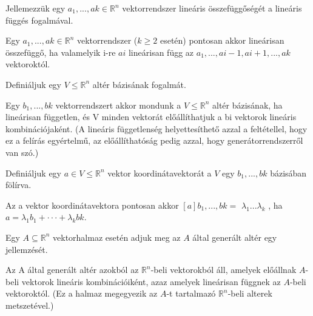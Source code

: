 \begin{frame}
  \begin{tcolorbox}[title={5}]
    Jellemezzük egy $a_1,...,ak \in \mathbb{R}^n$ vektorrendszer lineáris összefüggőségét a lineáris függés fogalmával.


  \tcblower
Egy $a_1,...,ak \in \mathbb{R}^n$ vektorrendszer ($k \geq 2$ esetén) pontosan akkor lineárisan összefüggő, ha valamelyik i-re $ai$ lineárisan függ az $a_1,...,ai-1,ai+1,...,ak$ vektoroktól.
  \end{tcolorbox}
\end{frame}


\begin{frame}
  \begin{tcolorbox}[title={6}]
      Definiáljuk egy $V \leq \mathbb{R}^n$ altér bázisának fogalmát.


  \tcblower
Egy $b_1,...,bk$ vektorrendszert akkor mondunk a $V \leq \mathbb{R}^n$ altér bázisának, ha lineárisan független, és V minden vektorát előállíthatjuk a bi vektorok lineáris kombinációjaként. (A lineáris függetlenség helyettesíthető azzal a feltétellel, hogy ez a felírás egyértelmű, az előállíthatóság pedig azzal, hogy generátorrendszerről van szó.)
  \end{tcolorbox}
\end{frame}


\begin{frame}
  \begin{tcolorbox}[title={7}]
      Definiáljuk egy $a \in V \leq \mathbb{R}^n$ vektor koordinátavektorát a $V$ egy $b_1,...,bk$ bázisában fölírva.


  \tcblower
Az a vektor koordinátavektora pontosan akkor $[a]b_1,...,bk =$
${\lambda}_1 . . . {\lambda}_k$
, ha $a = {\lambda}_1b_1+ \cdot  \cdot  \cdot +{\lambda}_kbk$.
  \end{tcolorbox}
\end{frame}


\begin{frame}
  \begin{tcolorbox}[title={8}]
       Egy $A {\subseteq} \mathbb{R}^n$ vektorhalmaz esetén adjuk meg az $A$ által generált altér egy jellemzését.


  \tcblower
Az A által generált altér azokból az $\mathbb{R}^n$-beli vektorokból áll, amelyek előállnak $A$-beli vektorok lineáris kombinációiként, azaz amelyek lineárisan függnek az $A$-beli vektoroktól. (Ez a halmaz megegyezik az $A$-t tartalmazó $\mathbb{R}^n$-beli alterek metszetével.)

  \end{tcolorbox}
\end{frame}



